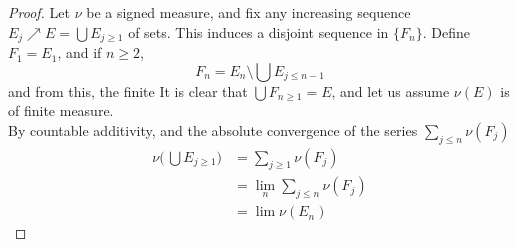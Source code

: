 \documentclass[../../main.tex]{subfiles}
\begin{document}
\providecommand{\fn}{\{F_n\}}
\begin{wts}
    
\end{wts}
\begin{proof}
    Let $\nu$ be a signed measure, and fix any increasing sequence $E_j\nearrow E=\bigcup E_{j\geq 1}$ of sets. This induces a disjoint sequence in $\{F_n\}$. Define $F_1 = E_1$, and if $n\geq 2$,
    \[F_n = E_n\setminus\bigcup E_{j\leq n-1}\]
    and from this, the finite 
    It is clear that $\bigcup F_{n\geq 1} = E$, and let us assume $\nu(E)$ is of finite measure.\\
    By countable additivity, and the absolute convergence of the series $\sum_{j\leq n}\nu(F_j)$
    \begin{align*}
        \nu\biggl(\,\bigcup E_{j\geq 1}\biggr)&= \sum_{j\geq 1}\nu(F_j)\\
        &= \lim_{n}\sum_{j\leq n}\nu(F_j)\\
        &=\lim \nu(E_n)
    \end{align*}
    
\end{proof}
\end{document}
